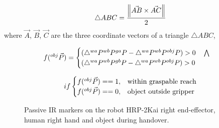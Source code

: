 \begin{equation}\label{area general}
        \triangle{ABC} = \frac{\norm{ \vec{AB} \times \vec{AC} }} {2} \\
\end{equation}
where $\vec{A}$, $\vec{B}$, $\vec{C}$ are the three coordinate vectors of a triangle $\triangle{ABC}$,


\begin{equation}\label{area}
    \centering
    f({}^{obj}\vec{P}) = 
    \begin{cases}
     (\triangle{{}^{wa}P {}^{wb}P {}^{ga}P} - \triangle{{}^{wa}P {}^{wb}P {}^{obj}P}) > 0 \quad \bigwedge \\
     (\triangle{{}^{wa}P {}^{wb}P {}^{gb}P} - \triangle{{}^{wa}P {}^{wb}P {}^{obj}P}) > 0
   \end{cases}         
\end{equation}

\begin{equation}\label{area bool}
    \centering
    if
    \begin{cases}
     f({}^{obj}\vec{P})==1, & \text{within graspable reach}  \\
     f({}^{obj}\vec{P})==0, & \text{object outside gripper}
   \end{cases}         
\end{equation}



\begin{figure}[ht]
	\caption{Passive IR markers on the robot HRP-2Kai right end-effector, human right hand and object during handover.}
	\label{fig:markerEf2}
\end{figure} 

